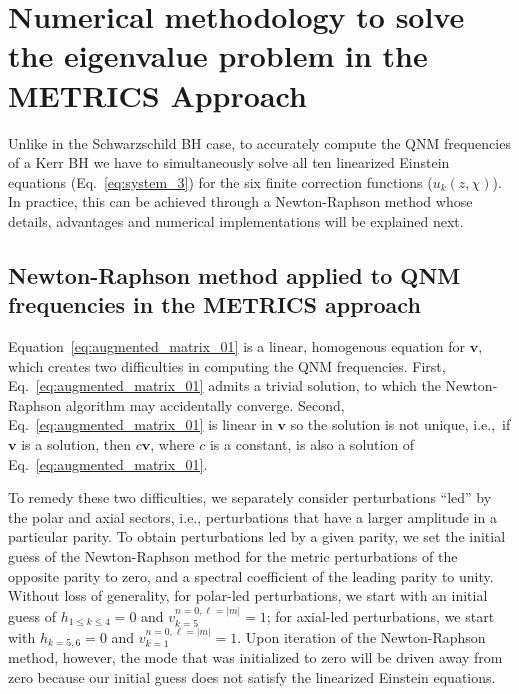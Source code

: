\documentclass[aps,prx,amsmath,floats,floatfix,twocolumn,
  superscriptaddress,nofootinbib,showpacs]{revtex4-1}
\begin{document}
\section{Numerical methodology to solve the eigenvalue problem in the METRICS Approach}
\label{sec:extraction}

Unlike in the Schwarzschild BH case, to accurately compute the QNM frequencies of a Kerr BH we have to simultaneously solve all ten linearized Einstein equations (Eq.~\eqref{eq:system_3}) for the six finite correction functions ($u_k(z, \chi)$). 
In practice, this can be achieved through a Newton-Raphson method whose details, advantages and numerical implementations will be explained next.

\subsection{Newton-Raphson method applied to QNM frequencies in the METRICS approach}
\label{sec:newton_method}

Equation~\eqref{eq:augmented_matrix_01} is a linear, homogenous equation for $\textbf{v}$, which creates two difficulties in computing the QNM frequencies. 
First, Eq.~\eqref{eq:augmented_matrix_01} admits a trivial solution, to which the Newton-Raphson algorithm may accidentally converge.
Second, Eq.~\eqref{eq:augmented_matrix_01} is linear in $\textbf{v}$ so the solution is not unique, i.e.,~if $\textbf{v}$ is a solution, then $c \textbf{v}$, where $c$ is a constant, is also a solution of Eq.~\eqref{eq:augmented_matrix_01}. 

To remedy these two difficulties, we separately consider perturbations ``led'' by the polar and axial sectors, i.e., perturbations that have a larger amplitude in a particular parity. 
To obtain perturbations led by a given parity, we set the initial guess of the Newton-Raphson method for the metric perturbations of the opposite parity to zero, and a spectral coefficient of the leading parity to unity.
Without loss of generality, for polar-led perturbations, we start with an initial guess of $h_{1 \leq k \leq 4} = 0$ and $v_{k=5}^{n=0,\ell=|m|} = 1$; for axial-led perturbations, we start with $h_{k =5, 6} = 0$ and $v_{k=1}^{n=0,\ell=|m|} = 1$. 
Upon iteration of the Newton-Raphson method, however, the mode that was initialized to zero will be driven away from zero because our initial guess does not satisfy the linearized Einstein equations.
\end{document}
